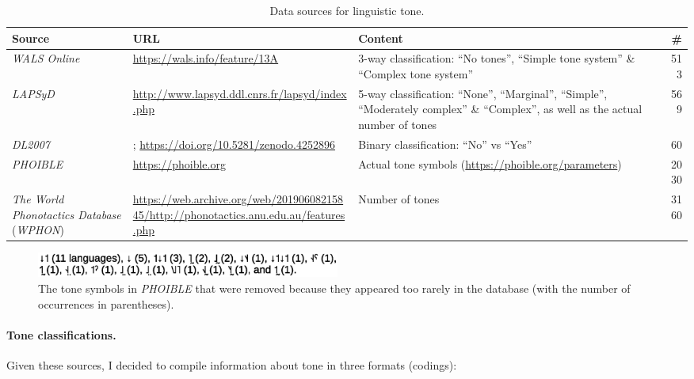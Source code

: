 \documentclass[twoside,onecolumn]{article}
\begin{document}
\begin{table}[h]
  \caption{Data sources for linguistic tone.}
  \label{Tab:tone_data_surces}
  \centering
  \begin{tabularx}{\textwidth}{|X|X|X|r|}
    \toprule
    \textbf{Source} & \textbf{URL} & \textbf{Content} & \textbf{\#} \\
    \midrule
    \textit{WALS Online} \citep{dryer_wals_2013} & \url{https://wals.info/feature/13A} & 3-way classification: ``No tones'', ``Simple tone system'' \& ``Complex tone system''  & 513 \\
    \textit{LAPSyD} & \url{http://www.lapsyd.ddl.cnrs.fr/lapsyd/index.php} & 5-way classification: ``None'', ``Marginal'', ``Simple'', ``Moderately complex'' \& ``Complex'', as well as the actual number of tones  & 569 \\
    \textit{DL2007} \citep{dediu_ladd_2007} & \citet[Annex 6, p. 373--386]{dediu_phd_2007}; \url{https://doi.org/10.5281/zenodo.4252896} & Binary classification: ``No'' vs ``Yes''  & 60 \\
    \textit{PHOIBLE} \citep{moran_phoible_2014} & \url{https://phoible.org} & Actual tone symbols (\url{https://phoible.org/parameters})  & 2030 \\
    \textit{The World Phonotactics Database} (\textit{WPHON}) \citep{donohue_world_2013} & \url{https://web.archive.org/web/20190608215845/http://phonotactics.anu.edu.au/features.php} & Number of tones  & 3160 \\
    \bottomrule
  \end{tabularx}
\end{table}

\begin{figure}[h]
  \centering
  \includegraphics[width=10cm]{phoible_rare_tone_symbols}
  \caption{The tone symbols in \textit{PHOIBLE} that were removed because they appeared too rarely in the database (with the number of occurrences in parentheses).}
  \label{Fig:rare_phoible_tone_symbols}
\end{figure}


\paragraph{Tone classifications.}

Given these sources, I decided to compile information about tone in three formats (codings):
\end{document}
